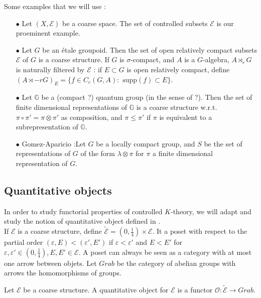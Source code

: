 \begin{Expl} Some examples that we will use :\\
\begin{itemize}
\item[$\bullet$] Let $(X,\mathcal E)$ be a coarse space. The set of controlled subsets $\mathcal E$ is our proeminent example.
\item[$\bullet$] Let $G$ be an étale groupoid. Then the set of open relatively compact subsets $\mathcal E$ of $G$ is a coarse structure. If $G$ is $\sigma$-compact, and $A$ is a $G$-algebra, $A\rtimes_r G$ is naturally filtered by $\mathcal E$ : if $E\subset G$ is open relatively compact, define $(A\rtimes-r G)_E = \{f\in C_c(G,A) : \text{ supp}(f)\subset E\}$.
\item[$\bullet$] Let $\mathbb G$ be a (compact ?) quantum group (in the sense of ?). Then the set of finite dimensional representations of $\mathbb G$ is a coarse structure w.r.t. $\pi\circ \pi'=\pi\otimes \pi'$ as composition, and $\pi\leq\pi'$ if $\pi$ is equivalent to a subrepresentation of $\mathbb G$.
\item[$\bullet$] Gomez-Aparicio :Let $G$ be a locally compact group, and $S$ be the set of representations of $G$ of the form $\lambda\otimes\pi$ for $\pi$ a finite dimensional representation of $G$.\end{itemize}   
\end{Expl}

\subsection{Quantitative objects}
In order to study functorial properties of controlled $K$-theory, we will adapt and study the notion of quantitative object defined in \cite{OY2}.\\

If $\mathcal E$ is a coarse structure, define $\mathcal{\tilde E} = (0,\frac{1}{4})\times \mathcal E$. It a poset with respect to the partial order $(\varepsilon,E)<(\varepsilon', E')$ if $\varepsilon<\varepsilon'$ and $E<E'$ for $\varepsilon,\varepsilon'\in (0,\frac{1}{4}),E,E'\in\mathcal E$. A poset can always be seen as a category with at most one arrow between objets. Let $Grab$ be the category of abelian groups with arrows the homomorphisms of groups.
\begin{definition}
Let $\mathcal E$ be a coarse structure. A quantitative object for $\mathcal E$ is a functor $\mathcal O :  \mathcal{\tilde E} \rightarrow Grab$.
\end{definition}

